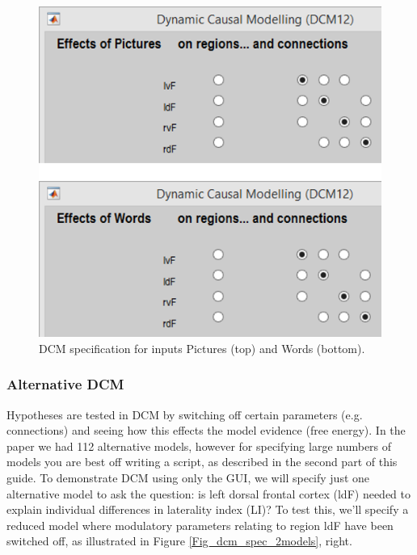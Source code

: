 \documentclass{article}
\begin{document}
\begin{itemize}
\begin{figure}[ht]
\begin{center}
\includegraphics{"Fig_dcm_spec_Pictures_Words"}
\caption{DCM specification for inputs Pictures (top) and Words (bottom).\label{Fig_dcm_spec_Pictures_Words}}
\end{center}
\end{figure}

\end{itemize}

\subsubsection{Alternative DCM} \label{GUI_altDCM}
Hypotheses are tested in DCM by switching off certain parameters (e.g. connections) and seeing how this effects the model evidence (free energy). In the paper we had 112 alternative models, however for specifying large numbers of models you are best off writing a script, as described in the second part of this guide. To demonstrate DCM using only the GUI, we will  specify just one alternative model to ask the question:  is left dorsal frontal cortex (ldF) needed to explain individual differences in laterality index (LI)? To test this, we'll specify a reduced model where modulatory parameters relating to region ldF have been switched off, as illustrated in Figure \ref{Fig_dcm_spec_2models}, right.
\end{document}
